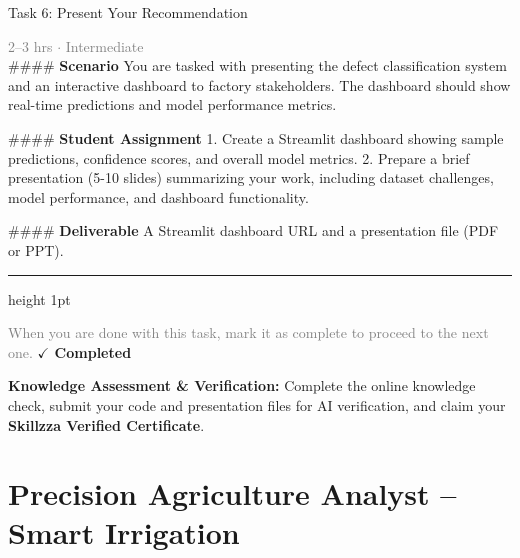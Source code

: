 \documentclass[10pt,a4paper]{article}
\begin{document}
\begin{taskbox}{Task 6: Present Your Recommendation}

    {\small \textcolor{gray}{2--3 hrs $\cdot$ Intermediate}}\\[12pt]

    \#\#\#\# \textbf{Scenario}  
You are tasked with presenting the defect classification system and an interactive dashboard to factory stakeholders. The dashboard should show real-time predictions and model performance metrics.  

\#\#\#\# \textbf{Student Assignment}  
1. Create a Streamlit dashboard showing sample predictions, confidence scores, and overall model metrics.  
2. Prepare a brief presentation (5-10 slides) summarizing your work, including dataset challenges, model performance, and dashboard functionality.  

\#\#\#\# \textbf{Deliverable}  
A Streamlit dashboard URL and a presentation file (PDF or PPT).\par

    \vspace{16pt}

    \textcolor{cardBorder}{\hrule height 1pt}\vspace{8pt}

    \small \textcolor{gray}{When you are done with this task, mark it as complete to proceed to the next one.} \hfill \textbf{\textcolor{brandDark}{$\checkmark$ Completed}}

\end{taskbox}

\begin{completionbox}
    \textbf{Knowledge Assessment \& Verification:} Complete the online knowledge check, submit your code and presentation files for AI verification, and claim your \textbf{Skillzza Verified Certificate}.
\end{completionbox}

\newpage




\section*{Precision Agriculture Analyst – Smart Irrigation}

\end{document}
